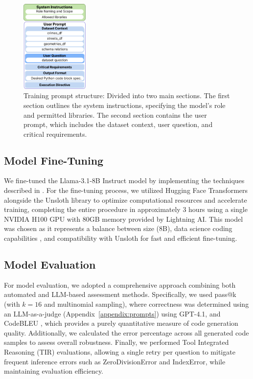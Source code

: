 \begin{figure}[hbtp]
  \centering
  \includegraphics[width=0.3\textwidth]{images/prompt.png}
  \caption{Training prompt structure: Divided into two main sections. The first section outlines the system instructions, specifying the model's role and permitted libraries. The second section contains the user prompt, which includes the dataset context, user question, and critical requirements.}
  \label{fig:training_prompt_structure}
\end{figure}



\subsection{Model Fine-Tuning}

We fine-tuned the Llama-3.1-8B Instruct model \citep{Grattafiori2024Llama3, Unsloth2024WhatModel} by implementing the techniques described in \cite{Pareja2024RecipesSFT}. For the fine-tuning process, we utilized Hugging Face Transformers alongside the Unsloth library to optimize computational resources and accelerate training, completing the entire procedure in approximately 3 hours using a single NVIDIA H100 GPU with 80GB memory provided by Lightning AI. This model was chosen as it represents a balance between size (8B), data science coding capabilities \citep{Lai2022DS1000}, and compatibility with Unsloth for fast and efficient fine-tuning.



\subsection{Model Evaluation}

For model evaluation, we adopted a comprehensive approach combining both automated and LLM-based assessment methods. Specifically, we used pass@k \citep{Levi2024SimpleModelInferenceScalingLaws} (with $k=16$ and multinomial sampling), where correctness was determined using an LLM-as-a-judge \citep{Li2025LLMJudge} (Appendix~\ref{appendix:prompts}) using GPT-4.1, and CodeBLEU \citep{Ren2020CodeBLEU}, which provides a purely quantitative measure of code generation quality. Additionally, we calculated the error percentage across all generated code samples to assess overall robustness. Finally, we performed Tool Integrated Reasoning (TIR) \citep{Fleureau2024NuminaMath} evaluations, allowing a single retry per question to mitigate frequent inference errors such as ZeroDivisionError and IndexError, while maintaining evaluation efficiency.

